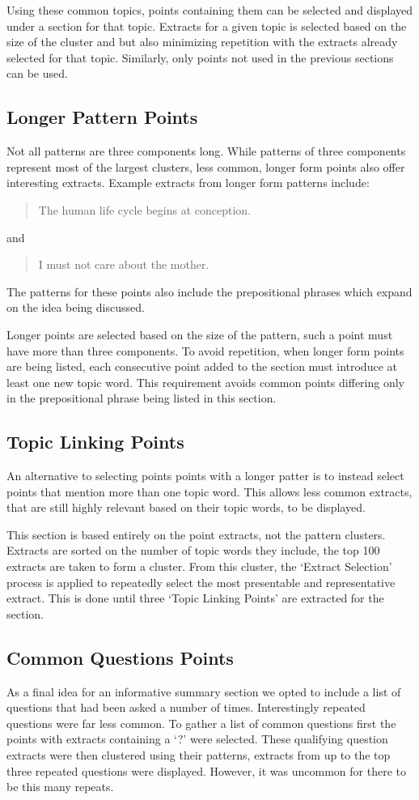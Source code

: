       Using these common topics, points containing them can be selected and displayed under a section for that topic. Extracts for a given topic is selected based on the size of the cluster and but also minimizing repetition with the extracts already selected for that topic. Similarly, only points not used in the previous sections can be used.

    \subsection{Longer Pattern Points}
      Not all patterns are three components long. While patterns of three components represent most of the largest clusters, less common, longer form points also offer interesting extracts. Example extracts from longer form patterns include: \blockquote{The human life cycle begins at conception.} and \blockquote{I must not care about the mother.}. The patterns for these points also include the prepositional phrases which expand on the idea being discussed.

      Longer points are selected based on the size of the pattern, such a point must have more than three components. To avoid repetition, when longer form points are being listed, each consecutive point added to the section must introduce at least one new topic word. This requirement avoids common points differing only in the prepositional phrase being listed in this section.

    \subsection{Topic Linking Points}
      An alternative to selecting points points with a longer patter is to instead select points that mention more than one topic word. This allows less common extracts, that are still highly relevant based on their topic words, to be displayed.

      This section is based entirely on the point extracts, not the pattern clusters. Extracts are sorted on the number of topic words they include, the top 100 extracts are taken to form a cluster. From this cluster, the `Extract Selection' process is applied to repeatedly select the most presentable and representative extract. This is done until three `Topic Linking Points' are extracted for the section.

    \subsection{Common Questions Points}
      As a final idea for an informative summary section we opted to include a list of questions that had been asked a number of times. Interestingly repeated questions were far less common. To gather a list of common questions first the points with extracts containing a `?' were selected. These qualifying question extracts were then clustered using their patterns, extracts from up to the top three repeated questions were displayed. However, it was uncommon for there to be this many repeats.
